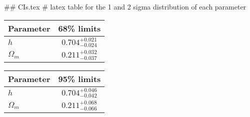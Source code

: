 ## CIs.tex
# latex table for the 1 and 2 sigma distribution of each parameter

\begin{tabular} { l  c}
 Parameter &  68\% limits\\
\hline
{\boldmath$h              $} & $0.704^{+0.021}_{-0.024}   $\\
{\boldmath$\Omega_m       $} & $0.211^{+0.032}_{-0.037}   $\\
\hline
\end{tabular}

\begin{tabular} { l  c}
 Parameter &  95\% limits\\
\hline
{\boldmath$h              $} & $0.704^{+0.046}_{-0.042}   $\\
{\boldmath$\Omega_m       $} & $0.211^{+0.068}_{-0.066}   $\\
\hline
\end{tabular}
